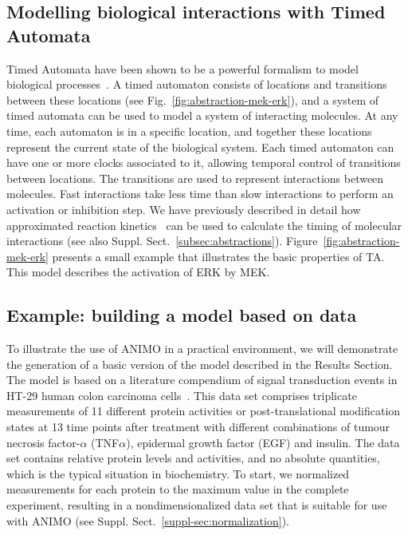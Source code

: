 \documentclass{bmcart}
\def\ta{Timed Automaton}
\def\tas{Timed Automata}
\begin{document}
\subsection*{Modelling biological interactions with Timed Automata}\label{subsec:timed-automata}
\def\ta{TA}
\def\tas{TA}

Timed Automata have been shown to be a powerful formalism to model biological
processes~\cite{ta-siebert,bartocci-oscillators,oded-ode-ta-discretization}. A timed automaton consists of locations
and transitions between these locations (see Fig.~\ref{fig:abstraction-mek-erk}), and a system of timed automata can be
used to model a system of interacting molecules. At any time, each automaton is in a specific location, and together
these locations represent the current state of the biological system. Each timed automaton can have one or more clocks
associated to it, allowing temporal control of transitions between locations. The transitions are used to
represent interactions between molecules. Fast interactions take less time than slow interactions
to perform an activation or inhibition step. We have previously described in detail how approximated
reaction kinetics~\cite{animo-ieee} can be used to calculate the timing of molecular
interactions (see also Suppl. Sect.~\ref{subsec:abstractions}). Figure~\ref{fig:abstraction-mek-erk}
presents a small example that illustrates the basic properties of \tas.
This model describes the activation of ERK by MEK.




\subsection*{Example: building a model based on data}\label{subsec:case-study}
To illustrate the use of ANIMO in a practical environment, we will demonstrate the generation of a basic
version of the model described in the Results Section. The model is based on a literature compendium of
signal transduction events in HT-29 human colon carcinoma cells~\cite{pathway-compendium}. This data set comprises triplicate
measurements of 11 different protein activities or post-translational modification states at 13 time points after
treatment with different combinations of tumour necrosis factor-$\alpha$ (TNF$\alpha$), epidermal growth factor (EGF) and insulin.
The data set contains relative protein levels and activities, and no absolute quantities, which is the typical situation in biochemistry.
To start, we normalized measurements for each protein to the
maximum value in the complete experiment, resulting in a nondimensionalized data set that is suitable for use with ANIMO (see Suppl. Sect.~\ref{suppl-sec:normalization}).
\end{document}
